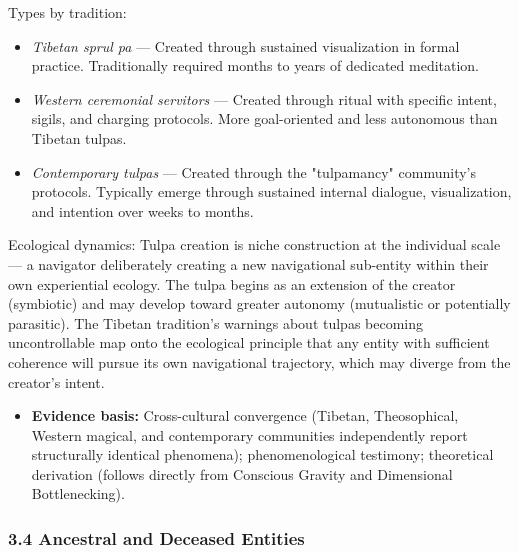 Types by tradition:

\begin{itemize}[nosep,leftmargin=*]
  \item \textit{Tibetan sprul pa} — Created through sustained visualization in formal practice. Traditionally required months to years of dedicated meditation.
  \item \textit{Western ceremonial servitors} — Created through ritual with specific intent, sigils, and charging protocols. More goal-oriented and less autonomous than Tibetan tulpas.
  \item \textit{Contemporary tulpas} — Created through the "tulpamancy" community's protocols. Typically emerge through sustained internal dialogue, visualization, and intention over weeks to months.
\end{itemize}


Ecological dynamics: Tulpa creation is niche construction at the individual scale — a navigator deliberately creating a new navigational sub-entity within their own experiential ecology. The tulpa begins as an extension of the creator (symbiotic) and may develop toward greater autonomy (mutualistic or potentially parasitic). The Tibetan tradition's warnings about tulpas becoming uncontrollable map onto the ecological principle that any entity with sufficient coherence will pursue its own navigational trajectory, which may diverge from the creator's intent.


\begin{itemize}[nosep,leftmargin=*]
  \item \textbf{Evidence basis:} Cross-cultural convergence (Tibetan, Theosophical, Western magical, and contemporary communities independently report structurally identical phenomena); phenomenological testimony; theoretical derivation (follows directly from Conscious Gravity and Dimensional Bottlenecking).
\end{itemize}


\subsubsection*{3.4 Ancestral and Deceased Entities}

